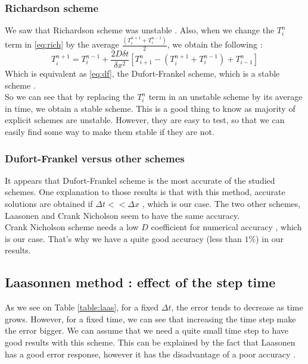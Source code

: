 \documentclass{article}
\begin{document}
                \subsubsection{Richardson scheme}
                    We saw that Richardson scheme was unstable \cite{rich}. Also, when we change the $T_{i}^n$ term
                    in \eqref{eq:rich} by the average $\frac{(T_i^{n+1}+T_i^{n-1})}{2}$, we obtain the following :
                    \begin{equation}
                        T_i^{n+1} = T_i^{n-1} + \frac{2D\delta t}{\delta x^2}[T_{i+1}^n - (T_i^{n+1}+T_i^{n-1}) + T_{i-1}^n]
                    \end{equation}
                    Which is equivalent as \eqref{eq:df}, the Dufort-Frankel scheme, which is a stable scheme \cite{df}.
                    \\
                    So we can see that by replacing the $T_{i}^n$ term in an unstable scheme by its average in time, we obtain 
                    a stable scheme. This is a good thing to know as majority of explicit schemes are unstable. However, they are
                    easy to test, so that we can easily find some way to make them stable if they are not.
                \subsubsection{Dufort-Frankel versus other schemes}
                    It appears that Dufort-Frankel scheme is the most accurate of the studied schemes. One explanation to those
                    results is that with this method, accurate solutions are obtained if $\Delta t << \Delta x$ \cite{df}, which
                    is our case.
                    The two other schemes, Laasonen and Crank Nicholson seem to have the same accuracy.
                    \\
                    Crank Nicholson scheme needs a low $D$ coefficient for numerical accuracy \cite{crank}, which is our case. That's why 
                    we have a quite good accuracy (less than $1\%$) in our results.
                
            \subsection{Laasonnen method : effect of the step time}
                As we see on Table \ref{table:laas}, for a fixed $\Delta t$, the error tends to decrease as time grows. However,
                for a fixed time, we can see that increasing the time step make the error bigger. We can assume that we need a
                quite small time step to have good results with this scheme. This can be explained by the fact that
                Laasonen has a good error response, however it has the disadvantage of a poor accuracy \cite{laas}.
        \newpage
\end{document}
